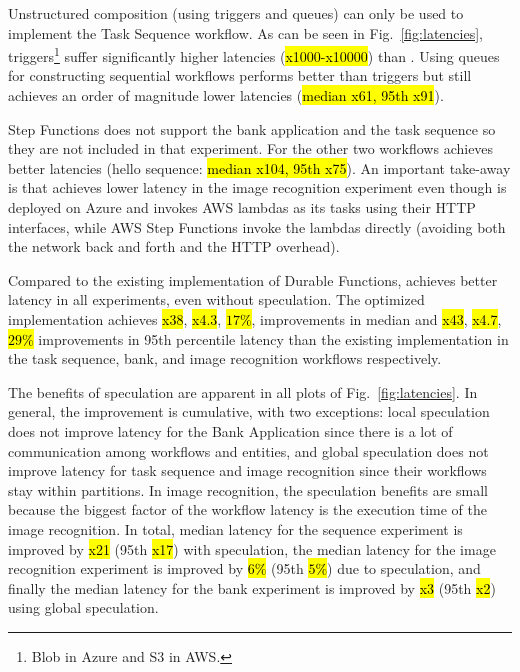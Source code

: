  
%
Unstructured composition (using triggers and queues) can only be used to implement the Task Sequence workflow. As can be seen in Fig.~\ref{fig:latencies}, triggers\footnote{Blob in Azure and S3 in AWS.} suffer significantly higher latencies (\hl{x1000-x10000}) than \sys. Using queues for constructing sequential workflows performs better than triggers but \sys still achieves an order of magnitude lower latencies (\hl{median x61, 95th x91}).

%
Step Functions does not support the bank application and the task sequence so they are not included in that experiment. For the other two workflows \sys achieves better latencies (hello sequence: \hl{median x104, 95th x75}). An important take-away is that \sys achieves lower latency in the image recognition experiment even though \sys is deployed on Azure and invokes AWS lambdas as its tasks using their HTTP interfaces, while AWS Step Functions invoke the lambdas directly (avoiding both the network back and forth and the HTTP overhead).

%
Compared to the existing implementation of Durable Functions, \sys achieves better latency in all experiments, even without speculation. The optimized \sys implementation achieves \hl{x38}, \hl{x4.3}, \hl{$17\%$}, improvements in median and \hl{x43}, \hl{x4.7}, \hl{$29\%$} improvements in 95th percentile latency than the existing implementation in the task sequence, bank, and image recognition workflows respectively.

%
The benefits of speculation are apparent in all plots of Fig.~\ref{fig:latencies}. In general, the improvement is cumulative, with two exceptions: local speculation does not improve latency for the Bank Application since there is a lot of communication among workflows and entities, and global speculation does not improve latency for task sequence and image recognition since their workflows stay within partitions. In image recognition, the speculation benefits are small because the biggest factor of the workflow latency is the execution time of the image recognition. In total, median latency for the sequence experiment is improved  by \hl{x21} (95th \hl{x17}) with speculation, the median latency for the image recognition experiment is improved by \hl{$6\%$} (95th \hl{$5\%$}) due to speculation, and finally the median latency for the bank experiment is improved by \hl{x3} (95th \hl{x2}) using global speculation.

